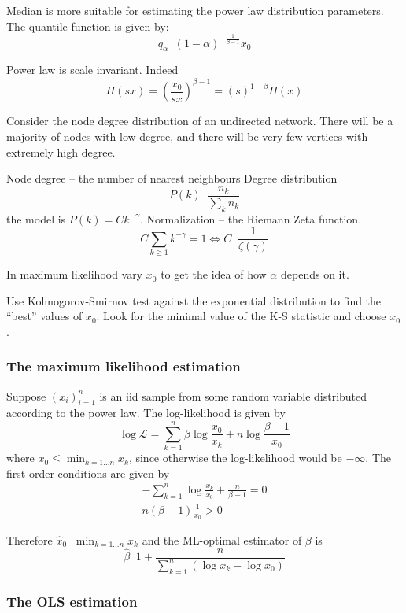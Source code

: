 \documentclass[a4paper]{article}
\newcommand{\brac}[1]{{\left ( #1 \right )}}
\newcommand{\defn}{\mathop{\overset{\Delta}{=}}\nolimits}
\begin{document}
Median is more suitable for estimating the power law distribution parameters. The quantile function is given by:
\[q_\alpha \defn \brac{1-\alpha}^{-\frac{1}{\beta - 1}} x_0 \]

Power law is scale invariant. Indeed 
\[H(s x) = \brac{\frac{x_0}{s x}}^{\beta - 1} = \brac{s}^{1-\beta} H(x)\]

Consider the node degree distribution of an undirected network.
There will be a majority of nodes with low degree,
and there will be very few vertices with extremely high degree.

Node degree -- the number of nearest neighbours
Degree distribution \[P(k) \defn \frac{n_k}{\sum_{k}n_k}\]
the model is $P(k) = C k^{-\gamma}$.
Normalization -- the Riemann Zeta function.
\[C \sum_{k\geq 1} k^{-\gamma} = 1 \Leftrightarrow C \defn \frac{1}{\zeta(\gamma)}\]

In maximum likelihood vary $x_0$ to get the idea of how $\alpha$ depends on it.

Use Kolmogorov-Smirnov test against the exponential distribution to find the ``best'' values of $x_0$.
Look for the minimal value of the K-S statistic and choose $x_0$.


\subsubsection{The maximum likelihood estimation} %
\label{ssub:the_mle}

Suppose $\brac{x_i}_{i=1}^n$ is an iid sample from some random variable distributed according to the power law.
The log-likelihood is given by \[\log\mathcal{L} = \sum_{k=1}^n \beta \log\frac{x_0}{x_k} + n \log\frac{\beta - 1}{x_0}\]
where $x_0\leq \min_{k=1\ldots n}x_k$, since otherwise the log-likelihood would be $-\infty$.
The first-order conditions are given by \begin{align*}
	- \sum_{k=1}^n \log\frac{x_k}{x_0} + \frac{n}{\beta - 1} = 0\\
	n \brac{ \beta - 1 } \frac{1}{x_0} > 0
\end{align*}

Therefore $\hat{x}_0 \defn \min_{k=1\ldots n}x_k$ and the ML-optimal estimator of $\beta$ is
\[\hat{\beta} \defn 1 + \frac{n}{\sum_{k=1}^n ( \log x_k - \log x_0 )}\]


\subsubsection{The OLS estimation} %
\label{ssub:the_ols_estimation}
\end{document}
